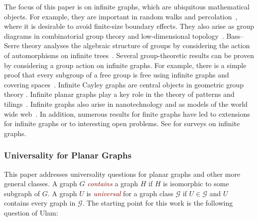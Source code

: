 \documentclass[a4paper,11pt]{article}
\newcommand{\defn}[1]{\textcolor{Maroon}{\emph{#1}}\index{#1}}
\theoremstyle{plain}
\theoremstyle{definition}
\newcommand{\GG}{\mathcal{G}}
\begin{document}

The focus of this paper is on infinite graphs, which are ubiquitous mathematical objects. For example, they are important in random walks and percolation~\citep{Grimmett99}, where it is desirable to avoid finite-size boundary effects. They also arise as group diagrams in combinatorial group theory \citep{LyndonSchupp77} and low-dimensional topology~\citep{Gersten83,Stallings83}. Bass--Serre theory analyses the algebraic structure of groups by considering the action of automorphisms on infinite trees~\citep{Serre77,Serre80,Bass93}. Several group-theoretic results can be proven by considering a group action on infinite graphs. For example, there is a simple proof that every subgroup of a free group is free using infinite graphs and covering spaces~\citep{NielsenSchreierTheorem}. Infinite Cayley graphs are central objects in geometric group theory \citep{delaHarpe00}. Infinite planar graphs play a key role in the theory of patterns and tilings~\citep{GS87}. Infinite graphs also arise in nanotechnology  \citep{FHI11} and as models of the world wide web~\citep{Bonato08}. In addition, numerous results for finite graphs have led to extensions for infinite graphs or to interesting open problems. See \citep{Thom83,Komjath11,NashWilliams67,Diestel90} for surveys on infinite graphs. 


\subsubsection*{Universality for Planar Graphs}

This paper addresses universality questions for planar graphs and other more general classes. A graph $G$ \defn{contains} a graph $H$ if $H$ is isomorphic to some subgraph of $G$. A graph $U$ is \defn{universal} for a graph class $\GG$ if $U\in\GG$ and $U$ contains every graph in $\GG$. 
The starting point for this work is the following question of Ulam: 
\end{document}
